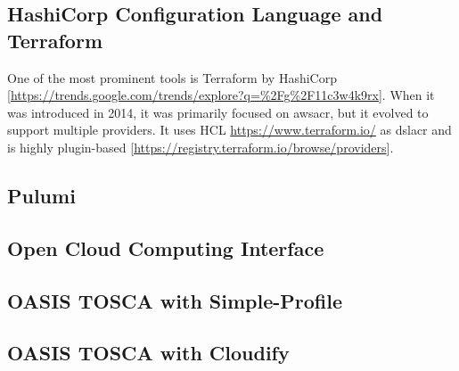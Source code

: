 \subsection{HashiCorp Configuration Language and Terraform}
One of the most prominent tools is Terraform by HashiCorp [\url{https://trends.google.com/trends/explore?q=%2Fg%2F11c3w4k9rx}]. When it was introduced in 2014, it was primarily focused on \gls{awsacr}, but it evolved to support multiple providers. It uses HCL \url{https://www.terraform.io/} as \gls{dslacr} and is highly plugin-based [\url{https://registry.terraform.io/browse/providers}].

\subsection{Pulumi}

\subsection{Open Cloud Computing Interface} %

\subsection{OASIS TOSCA with Simple-Profile}

\subsection{OASIS TOSCA with Cloudify}

